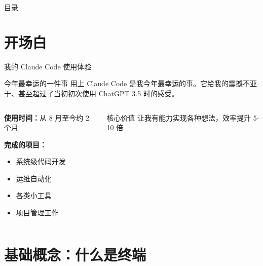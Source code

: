 \documentclass[aspectratio=169,xcolor=dvipsnames]{beamer}
\begin{document}
\begin{frame}[plain]
  \titlepage
\end{frame}

\begin{frame}[plain]{目录}
  \tableofcontents
\end{frame}

\section{开场白}

\begin{frame}{我的 Claude Code 使用体验}
  \begin{block}{今年最幸运的一件事}
    用上 Claude Code 是我今年最幸运的事。它给我的震撼不亚于、甚至超过了当初初次使用 ChatGPT 3.5 时的感受。
  \end{block}

  \vspace{0.5cm}

  \begin{columns}
    \begin{column}{0.48\textwidth}
      \textbf{使用时间：}从 8 月至今约 2 个月

      \vspace{0.3cm}

      \textbf{完成的项目：}
      \begin{itemize}
        \item 系统级代码开发
        \item 运维自动化
        \item 各类小工具
        \item 项目管理工作
      \end{itemize}
    \end{column}
    \begin{column}{0.48\textwidth}
      \begin{alertblock}{核心价值}
        让我有能力实现各种想法，效率提升 5-10 倍
      \end{alertblock}
    \end{column}
  \end{columns}
\end{frame}

\section{基础概念：什么是终端}
\end{document}
